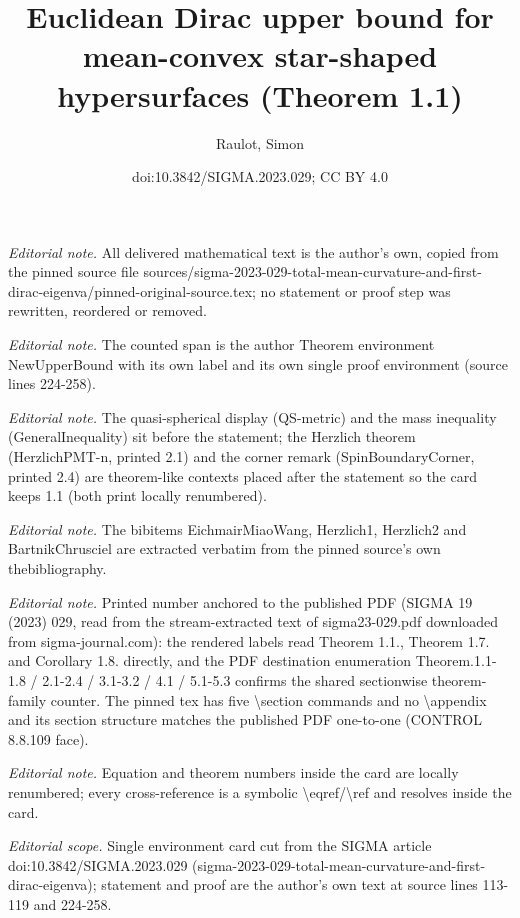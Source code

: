 \documentclass[10pt,a4paper]{article}
\title{Euclidean Dirac upper bound for mean-convex star-shaped hypersurfaces (Theorem 1.1)}
\author{Raulot, Simon}
\date{doi:10.3842/SIGMA.2023.029; CC BY 4.0}
\numberwithin{equation}{section}
\theoremstyle{definition}
\begin{document}
\maketitle
\setcounter{section}{1}
\setcounter{Theorem}{0}
\noindent\textit{Editorial note.} All delivered mathematical text is the author's own, copied from the pinned source file sources/sigma-2023-029-total-mean-curvature-and-first-dirac-eigenva/pinned-original-source.tex; no statement or proof step was rewritten, reordered or removed.\par\medskip
\noindent\textit{Editorial note.} The counted span is the author Theorem environment NewUpperBound with its own label and its own single proof environment (source lines 224-258).\par\medskip
\noindent\textit{Editorial note.} The quasi-spherical display (QS-metric) and the mass inequality (GeneralInequality) sit before the statement; the Herzlich theorem (HerzlichPMT-n, printed 2.1) and the corner remark (SpinBoundaryCorner, printed 2.4) are theorem-like contexts placed after the statement so the card keeps 1.1 (both print locally renumbered).\par\medskip
\noindent\textit{Editorial note.} The bibitems EichmairMiaoWang, Herzlich1, Herzlich2 and BartnikChrusciel are extracted verbatim from the pinned source's own thebibliography.\par\medskip
\noindent\textit{Editorial note.} Printed number anchored to the published PDF (SIGMA 19 (2023) 029, read from the stream-extracted text of sigma23-029.pdf downloaded from sigma-journal.com): the rendered labels read Theorem 1.1., Theorem 1.7. and Corollary 1.8. directly, and the PDF destination enumeration Theorem.1.1-1.8 / 2.1-2.4 / 3.1-3.2 / 4.1 / 5.1-5.3 confirms the shared sectionwise theorem-family counter. The pinned tex has five \textbackslash{}section commands and no \textbackslash{}appendix and its section structure matches the published PDF one-to-one (CONTROL 8.8.109 face).\par\medskip
\noindent\textit{Editorial note.} Equation and theorem numbers inside the card are locally renumbered; every cross-reference is a symbolic \textbackslash{}eqref/\textbackslash{}ref and resolves inside the card.\par\medskip
\noindent\textit{Editorial scope.} Single environment card cut from the SIGMA article doi:10.3842/SIGMA.2023.029 (sigma-2023-029-total-mean-curvature-and-first-dirac-eigenva); statement and proof are the author's own text at source lines 113-119 and 224-258.\par\medskip
\end{document}
